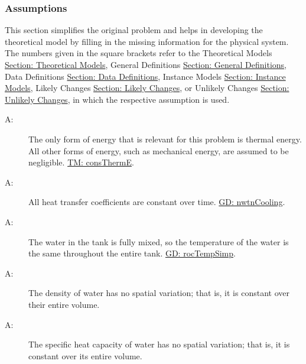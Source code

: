 \documentclass[12pt]{article}
\newcounter{assumpnum}
\newcommand{\atheassumpnum}{A\theassumpnum}
\begin{document}
\subsubsection{Assumptions}
\label{Sec:Assumps}
This section simplifies the original problem and helps in developing the theoretical model by filling in the missing information for the physical system. The numbers given in the square brackets refer to the Theoretical Models \hyperref[Sec:TMs]{Section: Theoretical Models}, General Definitions \hyperref[Sec:GDs]{Section: General Definitions}, Data Definitions \hyperref[Sec:DDs]{Section: Data Definitions}, Instance Models \hyperref[Sec:IMs]{Section: Instance Models}, Likely Changes \hyperref[Sec:LCs]{Section: Likely Changes}, or Unlikely Changes \hyperref[Sec:UCs]{Section: Unlikely Changes}, in which the respective assumption is used.
\begin{description}
\item[\atheassumpnum\label{A:Thermal-Energy-Only}:]The only form of energy that is relevant for this problem is thermal energy. All other forms of energy, such as mechanical energy, are assumed to be negligible. \hyperref[TM:consThermE]{TM: consThermE}.
\end{description}
\begin{description}
\item[\atheassumpnum\label{A:Heat-Transfer-Coeffs-Constant}:]All heat transfer coefficients are constant over time. \hyperref[GD:nwtnCooling]{GD: nwtnCooling}.
\end{description}
\begin{description}
\item[\atheassumpnum\label{A:Constant-Water-Temp-Across-Tank}:]The water in the tank is fully mixed, so the temperature of the water is the same throughout the entire tank. \hyperref[GD:rocTempSimp]{GD: rocTempSimp}.
\end{description}
\begin{description}
\item[\atheassumpnum\label{A:Density-Water-Constant-over-Volume}:]The density of water has no spatial variation; that is, it is constant over their entire volume.
\end{description}
\begin{description}
\item[\atheassumpnum\label{A:Specific-Heat-Energy-Constant-over-Volume}:]The specific heat capacity of water has no spatial variation; that is, it is constant over its entire volume.
\end{description}
\end{document}
